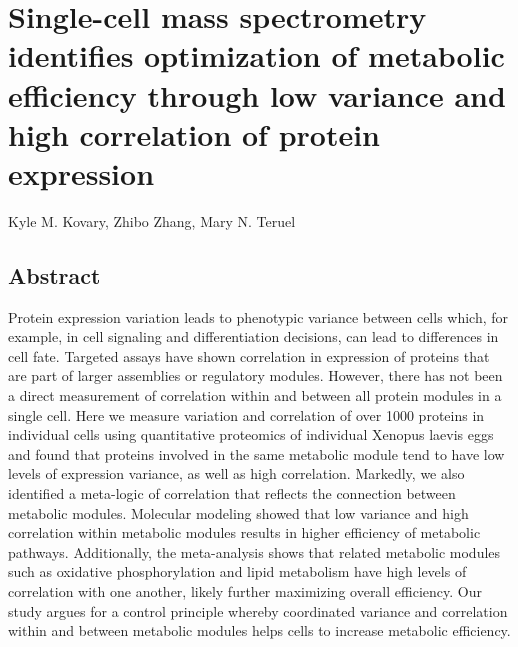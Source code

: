 \chapter{Single-cell mass spectrometry identifies optimization of metabolic efficiency through low variance and high correlation of protein expression}

\begin{center}
Kyle M. Kovary, Zhibo Zhang, Mary N. Teruel
\end{center}

\vspace*{\fill}


\newpage

\section{Abstract}
Protein expression variation leads to phenotypic variance between cells which, for example, in cell signaling and differentiation decisions, can lead to differences in cell fate. Targeted assays have shown correlation in expression of proteins that are part of larger assemblies or regulatory modules. However, there has not been a direct measurement of correlation within and between all protein modules in a single cell. Here we measure variation and correlation of over 1000 proteins in individual cells using quantitative proteomics of individual Xenopus laevis eggs and found that proteins involved in the same metabolic module tend to have low levels of expression variance, as well as high correlation. Markedly, we also identified a meta-logic of correlation that reflects the connection between metabolic modules. Molecular modeling showed that low variance and high correlation within metabolic modules results in higher efficiency of metabolic pathways. Additionally, the meta-analysis shows that related metabolic modules such as oxidative phosphorylation and lipid metabolism have high levels of correlation with one another, likely further maximizing overall efficiency. Our study argues for a control principle whereby coordinated variance and correlation within and between metabolic modules helps cells to increase metabolic efficiency.

